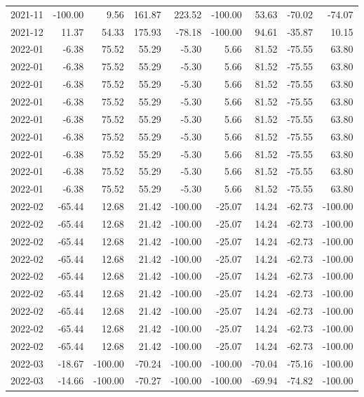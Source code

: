 \begin{table}[ht]
\begin{tabular}{lrrrrrrrr}
  2021-11 & -100.00 & 9.56 & 161.87 & 223.52 & -100.00 & 53.63 & -70.02 & -74.07 \\ 
  2021-12 & 11.37 & 54.33 & 175.93 & -78.18 & -100.00 & 94.61 & -35.87 & 10.15 \\ 
  2022-01 & -6.38 & 75.52 & 55.29 & -5.30 & 5.66 & 81.52 & -75.55 & 63.80 \\ 
  2022-01 & -6.38 & 75.52 & 55.29 & -5.30 & 5.66 & 81.52 & -75.55 & 63.80 \\ 
  2022-01 & -6.38 & 75.52 & 55.29 & -5.30 & 5.66 & 81.52 & -75.55 & 63.80 \\ 
  2022-01 & -6.38 & 75.52 & 55.29 & -5.30 & 5.66 & 81.52 & -75.55 & 63.80 \\ 
  2022-01 & -6.38 & 75.52 & 55.29 & -5.30 & 5.66 & 81.52 & -75.55 & 63.80 \\ 
  2022-01 & -6.38 & 75.52 & 55.29 & -5.30 & 5.66 & 81.52 & -75.55 & 63.80 \\ 
  2022-01 & -6.38 & 75.52 & 55.29 & -5.30 & 5.66 & 81.52 & -75.55 & 63.80 \\ 
  2022-01 & -6.38 & 75.52 & 55.29 & -5.30 & 5.66 & 81.52 & -75.55 & 63.80 \\ 
  2022-01 & -6.38 & 75.52 & 55.29 & -5.30 & 5.66 & 81.52 & -75.55 & 63.80 \\ 
  2022-02 & -65.44 & 12.68 & 21.42 & -100.00 & -25.07 & 14.24 & -62.73 & -100.00 \\ 
  2022-02 & -65.44 & 12.68 & 21.42 & -100.00 & -25.07 & 14.24 & -62.73 & -100.00 \\ 
  2022-02 & -65.44 & 12.68 & 21.42 & -100.00 & -25.07 & 14.24 & -62.73 & -100.00 \\ 
  2022-02 & -65.44 & 12.68 & 21.42 & -100.00 & -25.07 & 14.24 & -62.73 & -100.00 \\ 
  2022-02 & -65.44 & 12.68 & 21.42 & -100.00 & -25.07 & 14.24 & -62.73 & -100.00 \\ 
  2022-02 & -65.44 & 12.68 & 21.42 & -100.00 & -25.07 & 14.24 & -62.73 & -100.00 \\ 
  2022-02 & -65.44 & 12.68 & 21.42 & -100.00 & -25.07 & 14.24 & -62.73 & -100.00 \\ 
  2022-02 & -65.44 & 12.68 & 21.42 & -100.00 & -25.07 & 14.24 & -62.73 & -100.00 \\ 
  2022-02 & -65.44 & 12.68 & 21.42 & -100.00 & -25.07 & 14.24 & -62.73 & -100.00 \\ 
  2022-03 & -18.67 & -100.00 & -70.24 & -100.00 & -100.00 & -70.04 & -75.16 & -100.00 \\ 
  2022-03 & -14.66 & -100.00 & -70.27 & -100.00 & -100.00 & -69.94 & -74.82 & -100.00 \\ 

\end{tabular}
\end{table}
